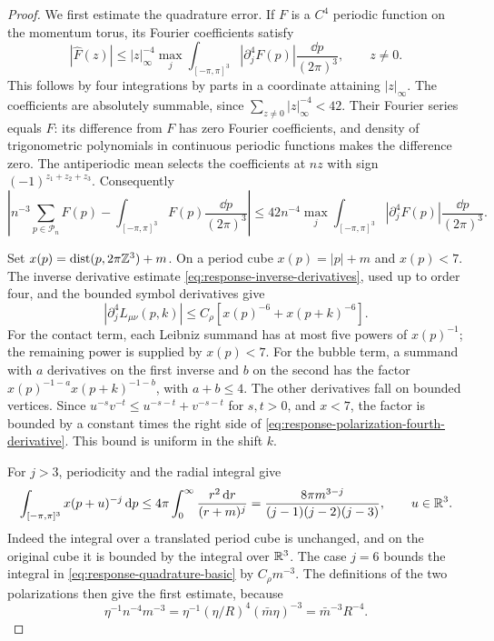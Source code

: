 \begin{proof}
We first estimate the quadrature error. If $F$ is a $C^4$
periodic function on the momentum torus, its Fourier coefficients
satisfy
\[
 |\widehat F(z)|\le |z|_\infty^{-4}
       \max_j\int_{[-\pi,\pi]^3}|\partial_j^4F(p)|
                                      \frac{\dd p}{(2\pi)^3},
                                                \qquad z\ne0.
\]
This follows by four integrations by parts in a coordinate attaining
$|z|_\infty$. The coefficients are absolutely summable, since
$\sum_{z\ne0}|z|_\infty^{-4}<42$. Their Fourier series equals
$F$: its difference from $F$ has zero Fourier coefficients,
and density of trigonometric polynomials in continuous periodic
functions makes the difference zero. The antiperiodic mean
selects the coefficients at $nz$ with sign $(-1)^{z_1+z_2+z_3}$.
Consequently
\begin{equation}\label{eq:response-quadrature-basic}
 \left|n^{-3}\sum_{p\in\mathcal P_n}F(p)
                  -\int_{[-\pi,\pi]^3}F(p)\frac{\dd p}{(2\pi)^3}\right|
 \le42n^{-4}\max_j
        \int_{[-\pi,\pi]^3}|\partial_j^4F(p)|
                                      \frac{\dd p}{(2\pi)^3}.
\end{equation}

Set $x(p)=\operatorname{dist}(p,2\pi\mathbb Z^3)+m$. On a period
cube $x(p)=|p|+m$ and $x(p)<7$. The inverse derivative
estimate \eqref{eq:response-inverse-derivatives}, used up
to order four, and the bounded symbol derivatives give
\begin{equation}\label{eq:response-polarization-fourth-derivative}
 |\partial_j^4L_{\mu\nu}(p,k)|
                 \le C_\rho[x(p)^{-6}+x(p+k)^{-6}].
\end{equation}
For the contact term, each Leibniz summand has at most five
powers of $x(p)^{-1}$; the remaining power is supplied by
$x(p)<7$. For the bubble term, a summand with $a$ derivatives
on the first inverse and $b$ on the second has the factor
$x(p)^{-1-a}x(p+k)^{-1-b}$, with $a+b\le4$.
The other derivatives fall on bounded vertices. Since
$u^{-s}v^{-t}\le u^{-s-t}+v^{-s-t}$ for $s,t>0$,
and $x<7$, the factor is bounded by a constant times the
right side of \eqref{eq:response-polarization-fourth-derivative}.
This bound is uniform in the shift $k$.

For $j>3$, periodicity and the radial integral give
\begin{equation}\label{eq:response-translated-integral}
 \int_{[-\pi,\pi]^3}x(p+u)^{-j}\,\mathrm d p
 \le4\pi\int_0^\infty\frac{r^2\,\mathrm d r}{(r+m)^j}
       =\frac{8\pi m^{3-j}}{(j-1)(j-2)(j-3)},
                                             \qquad u\in\mathbb R^3.
\end{equation}
Indeed the integral over a translated period cube is unchanged,
and on the original cube it is bounded by the integral over $\mathbb R^3$.
The case $j=6$ bounds the integral in
\eqref{eq:response-quadrature-basic} by $C_\rho m^{-3}$.
The definitions of the two polarizations then give the first
estimate, because
\[
 \eta^{-1}n^{-4}m^{-3}
           =\eta^{-1}(\eta/R)^4(\bar m\eta)^{-3}
           =\bar m^{-3}R^{-4}.
\]


\end{proof}
